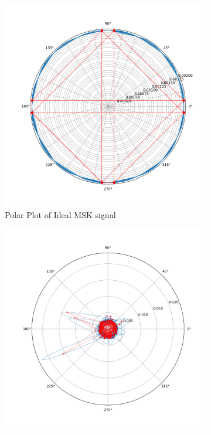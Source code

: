 \begin{figure}[h!]
    \centering
    \begin{subfigure}[b]{0.4\textwidth}
        \centering
        \includegraphics[width = \textwidth]{figs/sim/veri/polar_control.png}
        \caption{Polar Plot of Ideal MSK signal}
        \label{fig:polarcontrol}
    \end{subfigure}
        \begin{subfigure}[b]{0.4\textwidth}
        \centering
        \includegraphics[width = \textwidth]{figs/sim/veri/polarreal.png}

\end{subfigure}
\end{figure}

